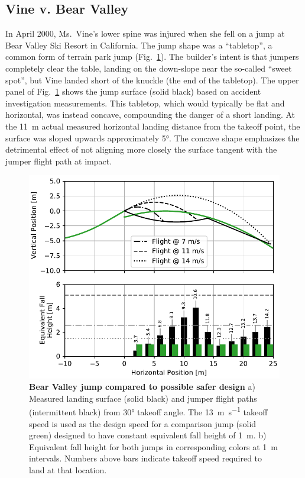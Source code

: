 \documentclass{article}
\begin{document}
\subsection{Vine v. Bear Valley}
%
In April 2000, Ms.~Vine's lower spine was injured when she fell on a jump at
Bear Valley Ski Resort in California. The jump shape was a ``tabletop'', a
common form of terrain park jump (Fig.~\ref{fig:vine-v-bear-valley}).  The builder's intent is that jumpers
completely clear the table, landing on the down-slope near the so-called
``sweet spot'', but Vine landed short of the knuckle (the end of the tabletop). The
upper panel of Fig.~\ref{fig:vine-v-bear-valley} shows the jump surface (solid
black) based on  accident investigation measurements. This tabletop, which
would typically be flat and horizontal, was instead concave, compounding the
danger of a short landing. At the 11~\si{\meter} actual measured horizontal
landing distance from the takeoff point, the surface was sloped upwards
approximately 5\si{\degree}. The concave shape emphasizes the detrimental
effect of not aligning more closely the surface tangent with the jumper flight
path at impact.
%
\begin{figure}
  \centering
  \includegraphics[width=5.25in]{figures/vine-v-bear-valley.pdf}
  \caption{\textbf{Bear Valley jump compared to possible safer design}
  a) Measured landing surface (solid black) and jumper flight paths
  (intermittent black) from 30\si{\degree} takeoff angle. The
  13~\si{\meter\per\second} takeoff speed is used as the design speed for a
  comparison jump (solid green) designed to have constant equivalent fall
  height of 1~\si{\meter}.
  b) Equivalent fall height for both jumps in corresponding
  colors at 1~\si{\meter} intervals. Numbers above bars indicate
  takeoff speed required to land at that location. 
  }
  \label{fig:vine-v-bear-valley}
\end{figure}
\end{document}
